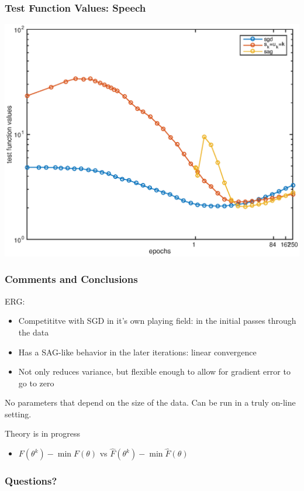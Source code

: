 \documentclass{beamer}
\begin{document}
\begin{frame}
	\frametitle{Test Function Values: Speech}
	\begin{center}
			\includegraphics[scale=0.5]{figB.eps}
	\end{center}
\end{frame}
 
		\begin{frame}
			\frametitle{Comments and Conclusions}
			
			ERG:
			\begin{itemize}
	\pause
				\item Competititve with SGD in it's own playing field: in the initial passes through the data
	
	\pause
				\item Has a SAG-like behavior in the later iterations: linear convergence 
	
				\pause
				\item Not only reduces variance, but flexible enough to allow for gradient error to go to zero
	
			\end{itemize}
	
	\pause
			No parameters that depend on the size of the data. Can be run in a truly on-line setting.
	
			\pause
			Theory is in progress
			\begin{itemize}
				\item $F(\theta^k) - \min F(\theta)$ vs $\hat{F}(\theta^k) - \min \hat{F}(\theta)$
			\end{itemize}
			
     	\end{frame}
 

		\begin{frame}
			\frametitle{Questions?}
		\end{frame}
		
\end{document}
